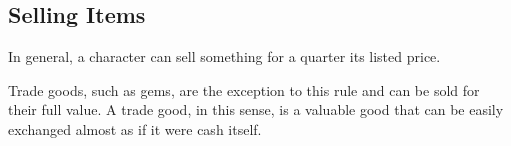 \subsection{Selling Items}
In general, a character can sell something for a quarter its listed price.

Trade goods, such as gems, are the exception to this rule and can be sold for their full value.
A trade good, in this sense, is a valuable good that can be easily exchanged almost as if it were cash itself.
